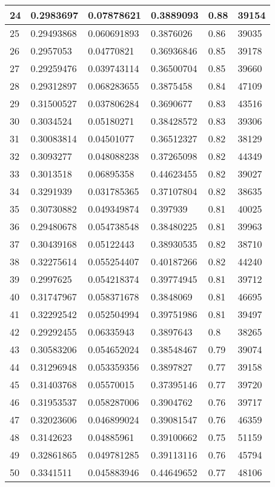 \begin{longtable}{|l|l|l|l|l|l|}
24 & 0.2983697 & 0.07878621 & 0.3889093 & 0.88 & 39154 \\ \hline 
25 & 0.29493868 & 0.060691893 & 0.3876026 & 0.86 & 39035 \\ \hline 
26 & 0.2957053 & 0.04770821 & 0.36936846 & 0.85 & 39178 \\ \hline 
27 & 0.29259476 & 0.039743114 & 0.36500704 & 0.85 & 39660 \\ \hline 
28 & 0.29312897 & 0.068283655 & 0.3875458 & 0.84 & 47109 \\ \hline 
29 & 0.31500527 & 0.037806284 & 0.3690677 & 0.83 & 43516 \\ \hline 
30 & 0.3034524 & 0.05180271 & 0.38428572 & 0.83 & 39306 \\ \hline 
31 & 0.30083814 & 0.04501077 & 0.36512327 & 0.82 & 38129 \\ \hline 
32 & 0.3093277 & 0.048088238 & 0.37265098 & 0.82 & 44349 \\ \hline 
33 & 0.3013518 & 0.06895358 & 0.44623455 & 0.82 & 39027 \\ \hline 
34 & 0.3291939 & 0.031785365 & 0.37107804 & 0.82 & 38635 \\ \hline 
35 & 0.30730882 & 0.049349874 & 0.397939 & 0.81 & 40025 \\ \hline 
36 & 0.29480678 & 0.054738548 & 0.38480225 & 0.81 & 39963 \\ \hline 
37 & 0.30439168 & 0.05122443 & 0.38930535 & 0.82 & 38710 \\ \hline 
38 & 0.32275614 & 0.055254407 & 0.40187266 & 0.82 & 44240 \\ \hline 
39 & 0.2997625 & 0.054218374 & 0.39774945 & 0.81 & 39712 \\ \hline 
40 & 0.31747967 & 0.058371678 & 0.3848069 & 0.81 & 46695 \\ \hline 
41 & 0.32292542 & 0.052504994 & 0.39751986 & 0.81 & 39497 \\ \hline 
42 & 0.29292455 & 0.06335943 & 0.3897643 & 0.8 & 38265 \\ \hline 
43 & 0.30583206 & 0.054652024 & 0.38548467 & 0.79 & 39074 \\ \hline 
44 & 0.31296948 & 0.053359356 & 0.3897827 & 0.77 & 39158 \\ \hline 
45 & 0.31403768 & 0.05570015 & 0.37395146 & 0.77 & 39720 \\ \hline 
46 & 0.31953537 & 0.058287006 & 0.3904762 & 0.76 & 39717 \\ \hline 
47 & 0.32023606 & 0.046899024 & 0.39081547 & 0.76 & 46359 \\ \hline 
48 & 0.3142623 & 0.04885961 & 0.39100662 & 0.75 & 51159 \\ \hline 
49 & 0.32861865 & 0.049781285 & 0.39113116 & 0.76 & 45794 \\ \hline 
50 & 0.3341511 & 0.045883946 & 0.44649652 & 0.77 & 48106 \\ \hline 
\end{longtable}